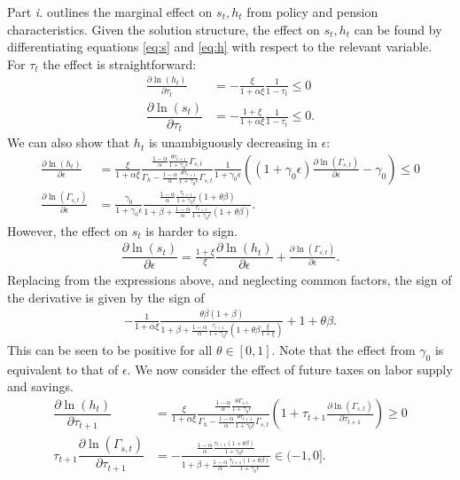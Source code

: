  Part \emph{i.} outlines the marginal effect on $s_t, h_t$ from policy and pension characteristics. Given the solution structure, the effect on $s_t, h_t$ can be found by differentiating equations \eqref{eq:s} and \eqref{eq:h} with respect to the relevant variable. For $\tau_t$ the effect is straightforward:
\begin{align*}
    \frac{\partial \ln(h_t)}{\partial \tau_t} &= -\frac{\xi}{1+\alpha\xi}\frac{1}{1-\tau_t} \leq 0\\
    \dfrac{\partial \ln(s_t)}{\partial \tau_t} &= -\frac{1+\xi}{1+\alpha\xi} \frac{1}{1-\tau_t} \leq 0.
\end{align*}
We can also show that $h_t$ is unambiguously decreasing in $\epsilon$:
\begin{align*}
    \frac{\partial \ln(h_t)}{\partial \epsilon} &= \frac{\xi}{1+\alpha\xi}\frac{\frac{1-\alpha}{\alpha}\frac{\theta \tau_{t+1}}{1+\gamma_0\epsilon}\Gamma_{s,t}}{\Gamma_h-\frac{1-\alpha}{\alpha}\frac{\theta\tau_{t+1}}{1+\gamma_0\epsilon}\Gamma_{s,t}}\frac{1}{1+\gamma_0\epsilon}\left((1+\gamma_0\epsilon)\frac{\partial \ln\left(\Gamma_{s,t}\right)}{\partial \epsilon}-\gamma_0\right)\leq 0 \\
    \frac{\partial \ln\left(\Gamma_{s,t}\right)}{\partial \epsilon}&= \frac{\gamma_0}{1+\gamma_0\epsilon}\frac{\frac{1-\alpha}{\alpha}\frac{\tau_{t+1}}{1+\gamma_0\epsilon}(1+\theta\beta)}{1+\beta+\frac{1-\alpha}{\alpha}\frac{\tau_{t+1}}{1+\gamma_0\epsilon}(1+\theta \beta)}.
\end{align*} 
However, the effect on $s_t$ is harder to sign. 
\begin{align*}
 \dfrac{\partial \ln\left(s_t\right)}{\partial \epsilon} = \frac{1+\xi}{\xi}\dfrac{\partial \ln\left(h_t\right)}{\partial \epsilon}+ \frac{\partial \ln\left(\Gamma_{s,t}\right)}{\partial \epsilon} . 
 \end{align*}
Replacing from the expressions above, and neglecting common factors, the sign of the derivative is given by the sign of
\begin{align*}
-\frac{1}{1+\alpha \xi}\frac{\theta \beta(1+\beta)}{1+\beta +\frac{1-\alpha}{\alpha}\frac{\tau_{t+1}}{1+\gamma_0 \epsilon}(1+\theta \beta \frac{\xi}{1+\xi})}+1+\theta \beta.
 \end{align*}
This can be seen to be positive for all $\theta \in[0,1]$. Note that the effect from $\gamma_0$ is equivalent to that of $\epsilon$. We now consider the effect of future taxes on labor supply and savings. 
\begin{align*}
    \dfrac{\partial \ln\left(h_t\right)}{\partial \tau_{t+1}} &= \frac{\xi}{1+\alpha\xi} \frac{\frac{1-\alpha}{\alpha}\frac{\theta \Gamma_{s,t}}{1+\gamma_0\epsilon}}{\Gamma_h-\frac{1-\alpha}{\alpha}\frac{\theta \tau_{t+1}}{1+\gamma_0\epsilon}\Gamma_{s,t}}\left(1+\tau_{t+1}\frac{\partial \ln\left(\Gamma_{s,t}\right)}{\partial \tau_{t+1}}\right) \geq 0 \\
    \tau_{t+1} \dfrac{\partial \ln\left(\Gamma_{s,t}\right)}{\partial \tau_{t+1}} &= - \frac{\frac{1-\alpha}{\alpha}\frac{\tau_{t+1}(1+\theta \beta)}{1+\gamma_0\epsilon}}{1+\beta+\frac{1-\alpha}{\alpha}\frac{\tau_{t+1}(1+\theta \beta)}{1+\gamma_0\epsilon}} \in (-1,0].
\end{align*}
